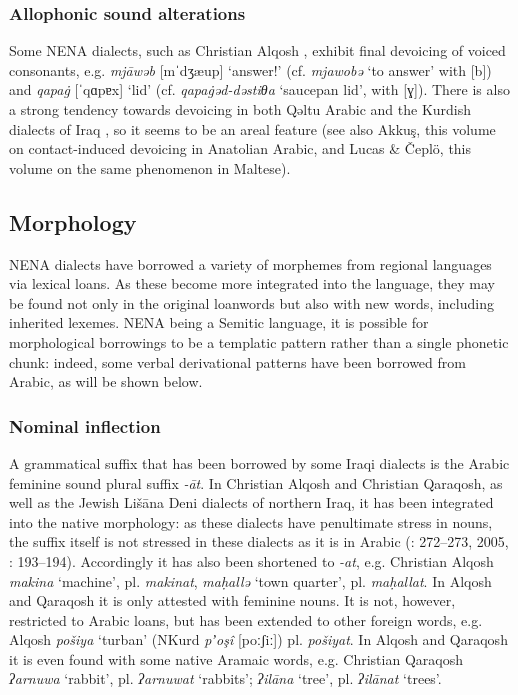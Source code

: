 \documentclass[output=paper]{langsci/langscibook}
\begin{document}
\subsubsection{Allophonic sound alterations}

Some NENA dialects, such as Christian Alqosh \citep[27]{Coghill2004}, exhibit final devoicing of voiced consonants, e.g. \textit{mjāwəb} [mˈdʒæup] ‘answer!’ (cf. \textit{mjawobə} ‘to answer’ with [b]) and \textit{qapa\.g} [ˈqɑpɐx] ‘lid’ (cf. \textit{qapa\.gəd-dəstiθa} ‘saucepan lid’, with [ɣ]). There is also a strong tendency towards devoicing in both Qəltu Arabic \citep[98]{Jastrow1978} and the Kurdish dialects of Iraq \citep[49]{MacKenzie1961}, so it seems to be an areal feature (see also Akkuş, this volume on contact-induced devoicing in Anatolian Arabic, and Lucas \& Čeplö, this volume on the same phenomenon in Maltese).

\subsection{Morphology}

NENA dialects have borrowed a variety of morphemes from regional languages via lexical loans. As these become more integrated into the language, they may be found not only in the original loanwords but also with new words, including inherited lexemes. NENA being a Semitic language, it is possible for morphological borrowings to be a templatic pattern rather than a single phonetic chunk: indeed, some verbal derivational patterns have been borrowed from Arabic, as will be shown below.

\subsubsection{\label{bkm:Ref534226861}Nominal inflection}

A grammatical suffix that has been borrowed by some Iraqi dialects is the Arabic feminine sound plural suffix \textit{{}-āt}. In Christian Alqosh and Christian Qaraqosh, as well as the Jewish Lišāna Deni dialects of northern Iraq, it has been integrated into the native morphology: as these dialects have penultimate stress in nouns, the suffix itself is not stressed in these dialects as it is in Arabic (\citealt{Coghill2004}: 272–273, 2005, \citealt{Khan2002}: 193–194). Accordingly it has also been shortened to \textit{\nobreakdash-at}, e.g. Christian Alqosh \textit{makina} ‘machine’, pl. \textit{makinat}, \textit{maḥallə} ‘town quarter’, pl. \textit{maḥallat}. In Alqosh and Qaraqosh it is only attested with feminine nouns. It is not, however, restricted to Arabic loans, but has been extended to other foreign words, e.g. Alqosh \textit{pošiya} ‘turban’ (NKurd \textit{pʼoşî} [poːʃiː]) pl. \textit{pošiyat}. In Alqosh and Qaraqosh it is even found with some native Aramaic words, e.g. Christian Qaraqosh \textit{ʔarnuwa} ‘rabbit’, pl. \textit{ʔarnuwat} ‘rabbits’; \textit{ʔilāna} ‘tree’, pl. \textit{ʔilānat} ‘trees’.
\end{document}
